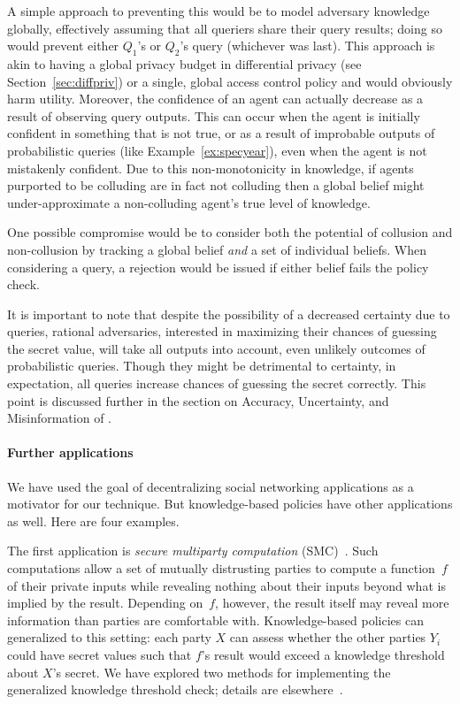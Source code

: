 A simple approach to preventing this would be to model adversary
knowledge globally, effectively assuming that all queriers share their
query results; doing so would prevent either $Q_1$'s or $Q_2$'s query
(whichever was last). This approach is akin to having a global privacy
budget in differential privacy (see Section~\ref{sec:diffpriv}) or a
single, global access control policy and would obviously harm utility.
Moreover, the confidence of an agent can actually decrease as a result
of observing query outputs. This can occur when the agent is initially
confident in something that is not true, or as a result of improbable
outputs of probabilistic queries (like Example~\ref{ex:specyear}),
even when the agent is not mistakenly confident. Due to this
non-monotonicity in knowledge, if agents purported to be colluding are
in fact not colluding then a global belief might under-approximate a
non-colluding agent's true level of knowledge. 

One possible compromise would be to consider both the potential of
collusion and non-collusion by tracking a global belief \emph{and} a
set of individual beliefs. When considering a query, a rejection would
be issued if either belief fails the policy check.

It is important to note that despite the possibility of a decreased
certainty due to queries, rational adversaries, interested in
maximizing their chances of guessing the secret value, will take all
outputs into account, even unlikely outcomes of probabilistic
queries. Though they might be detrimental to certainty, in
expectation, all queries increase chances of guessing the secret
correctly. This point is discussed further in the section on Accuracy,
Uncertainty, and Misinformation of
\cite{clarkson09quantifying}. 

\paragraph*{Further applications}

We have used the goal of decentralizing social networking applications
as a motivator for our technique.  But knowledge-based policies have
other applications as well.  Here are four examples.  

The first application is \emph{secure multiparty computation}
(SMC)~\cite{Yao86}.  Such computations allow a set of mutually
distrusting parties to compute a function~$f$ of their private inputs
while revealing nothing about their inputs beyond what is implied by
the result.  Depending on~$f$, however, the result itself may reveal
more information than parties are comfortable with.  Knowledge-based
policies can generalized to this setting: each party $X$ can assess
whether the other parties $Y_i$ could have secret values such that
$f$'s result would exceed a knowledge threshold about $X$'s secret.
We have explored two methods for implementing the generalized
knowledge threshold check; details are elsewhere~\cite{mardziel12smc}.

